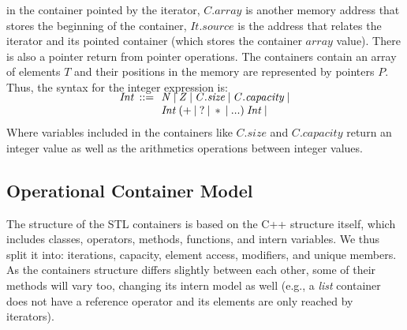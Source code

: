 \documentclass[a4paper]{llncs}
\begin{document}
in the container pointed by the iterator, $\mathit{C.array}$ is another
memory address that stores the beginning of the container,
$\mathit{It.source}$ is the address that relates the iterator
and its pointed container (which stores the container $array$ value).
There is also a pointer return from pointer operations.
The containers contain an array of elements $\mathit{T}$ and their
positions in the memory are represented by pointers $\mathit{P}$.
Thus, the syntax for the integer expression is:
%
\[\begin{array}{r@{\:\:}c@{\:\:}l}
\\[-5ex]
\mathit{Int}  & ::= & \: \mathit{N} \: | \: \mathit{Z} \: | \: \mathit{C.size} \: | \: \mathit{C.capacity} \: | \\
              &     & \: \mathit{Int} \: ( + \: | \: ? \: | \: * \: | \: ...) \: \mathit{Int}  \: | \\
\end{array}
\]
%
Where variables included in the containers
like $\mathit{C.size}$ and $\mathit{C.capacity}$ return
an integer value as well as the arithmetics
operations between integer values.

\subsection{Operational Container Model}

The structure of the STL containers is based on the
C++ structure itself, which includes classes, operators,
methods, functions, and intern variables. We thus split it into:
iterations, capacity, element access, modifiers, and unique
members. As the containers structure differs slightly
between each other, some of their methods will vary too,
changing its intern model as well (e.g., a \textit{list}
container does not have a reference operator and its elements
are only reached by iterators).
\end{document}
